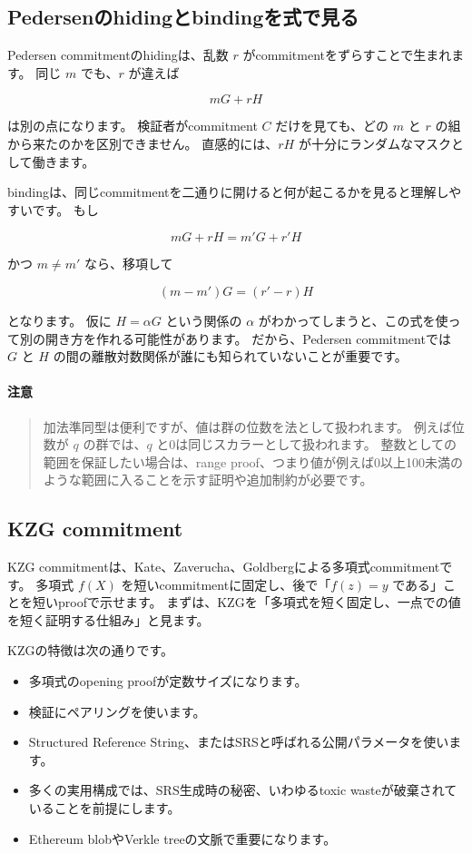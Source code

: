 \documentclass[a4paper,11pt]{ltjsarticle}
\newenvironment{warnbox}{%
  \paragraph*{注意}\begin{quote}
}{%
  \end{quote}
}
\begin{document}
\subsection{Pedersenのhidingとbindingを式で見る}

Pedersen commitmentのhidingは、乱数 \(r\) がcommitmentをずらすことで生まれます。
同じ \(m\) でも、\(r\) が違えば

\[
  mG+rH
\]

は別の点になります。
検証者がcommitment \(C\) だけを見ても、どの \(m\) と \(r\) の組から来たのかを区別できません。
直感的には、\(rH\) が十分にランダムなマスクとして働きます。

bindingは、同じcommitmentを二通りに開けると何が起こるかを見ると理解しやすいです。
もし

\[
  mG+rH=m'G+r'H
\]

かつ \(m\ne m'\) なら、移項して

\[
  (m-m')G=(r'-r)H
\]

となります。
仮に \(H=\alpha G\) という関係の \(\alpha\) がわかってしまうと、この式を使って別の開き方を作れる可能性があります。
だから、Pedersen commitmentでは \(G\) と \(H\) の間の離散対数関係が誰にも知られていないことが重要です。

\begin{warnbox}
加法準同型は便利ですが、値は群の位数を法として扱われます。
例えば位数が \(q\) の群では、\(q\) と0は同じスカラーとして扱われます。
整数としての範囲を保証したい場合は、range proof、つまり値が例えば0以上100未満のような範囲に入ることを示す証明や追加制約が必要です。
\end{warnbox}

\subsection{KZG commitment}

KZG commitmentは、Kate、Zaverucha、Goldbergによる多項式commitmentです。
多項式 \(f(X)\) を短いcommitmentに固定し、後で「\(f(z)=y\) である」ことを短いproofで示せます。
まずは、KZGを「多項式を短く固定し、一点での値を短く証明する仕組み」と見ます。

KZGの特徴は次の通りです。

\begin{itemize}
  \item 多項式のopening proofが定数サイズになります。
  \item 検証にペアリングを使います。
  \item Structured Reference String、またはSRSと呼ばれる公開パラメータを使います。
  \item 多くの実用構成では、SRS生成時の秘密、いわゆるtoxic wasteが破棄されていることを前提にします。
  \item Ethereum blobやVerkle treeの文脈で重要になります。
\end{itemize}
\end{document}
